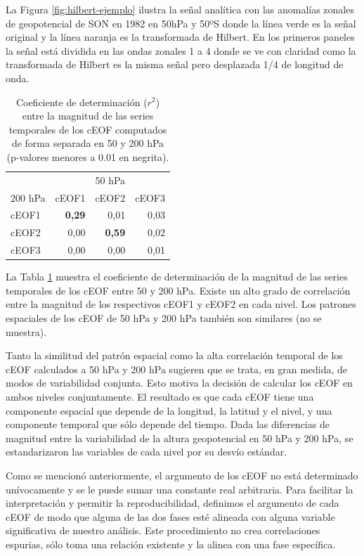 \documentclass[12pt,oneside,a4paper]{reedthesis}
\begin{document}
La Figura \ref{fig:hilbert-ejemplo} ilustra la señal analítica con las anomalías zonales de geopotencial de SON en 1982 en 50hPa y 50ºS donde la línea verde es la señal original y la línea naranja es la transformada de Hilbert.
En los primeros paneles la señal está dividida en las ondas zonales 1 a 4 donde se ve con claridad como la transformada de Hilbert es la misma señal pero desplazada 1/4 de longitud de onda.



\begin{table}

\caption{\label{tab:corr-ceof-splitted}Coeficiente de determinación (\(r^2\)) entre la magnitud de las series temporales de los cEOF computados de forma separada en 50 y 200 hPa (p-valores menores a 0.01 en negrita).}
\centering
\begin{tabular}[t]{l>{}r>{}r>{}r}
\toprule
\multicolumn{1}{c}{} & \multicolumn{3}{c}{50 hPa} \\
\cmidrule(l{3pt}r{3pt}){2-4}
200 hPa & cEOF1 & cEOF2 & cEOF3\\
\midrule
cEOF1 & \textbf{0,29} & 0,01 & 0,03\\
cEOF2 & 0,00 & \textbf{0,59} & 0,02\\
cEOF3 & 0,00 & 0,00 & 0,01\\
\bottomrule
\end{tabular}
\end{table}

La Tabla \ref{tab:corr-ceof-splitted} muestra el coeficiente de determinación de la magnitud de las series temporales de los cEOF entre 50 y 200 hPa.
Existe un alto grado de correlación entre la magnitud de los respectivos cEOF1 y cEOF2 en cada nivel.
Los patrones espaciales de los cEOF de 50 hPa y 200 hPa también son similares (no se muestra).

Tanto la similitud del patrón espacial como la alta correlación temporal de los cEOF calculados a 50 hPa y 200 hPa sugieren que se trata, en gran medida, de modos de variabilidad conjunta.
Esto motiva la decisión de calcular los cEOF en ambos niveles conjuntamente.
El resultado es que cada cEOF tiene una componente espacial que depende de la longitud, la latitud y el nivel, y una componente temporal que sólo depende del tiempo.
Dada las diferencias de magnitud entre la variabilidad de la altura geopotencial en 50 hPa y 200 hPa, se estandarizaron las variables de cada nivel por su desvío estándar.

Como se mencionó anteriormente, el argumento de los cEOF no está determinado unívocamente y se le puede sumar una constante real arbitraria.
Para facilitar la interpretación y permitir la reproducibilidad, definimos el argumento de cada cEOF de modo que alguna de las dos fases esté alineada con alguna variable significativa de nuestro análisis.
Este procedimiento no crea correlaciones espurias, sólo toma una relación existente y la alinea con una fase específica.
\end{document}
